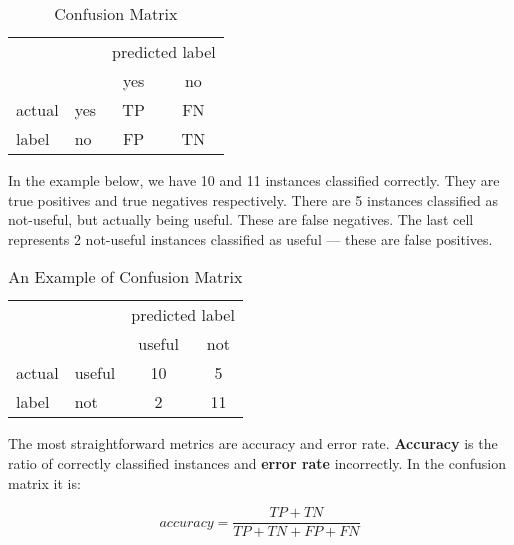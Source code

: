 
\begin{table}[h!]
\center
\begin{tabular}{ll|c|c|}
\cline{3-4}
& & \multicolumn{2}{l|}{predicted label} \\
\cline{3-4}
& & yes & no \\
\hline
\multicolumn{1}{|l|}{actual}& yes & TP & FN\\
\cline{2-4}
\multicolumn{1}{|l|}{label}						   & no & FP & TN \\

\hline

\end{tabular}
	\caption{Confusion Matrix}\label{tab:confmatrix}
\end{table}

In the example below, we have 10 and 11 instances classified correctly. 
They are true positives and true negatives respectively.
There are 5 instances classified as not-useful, but actually being useful.
These are false negatives.
The last cell represents 2 not-useful instances classified as useful --- these are false positives.

\begin{table}[h!]
\center
\begin{tabular}{ll|c|c|}
\cline{3-4}
& & \multicolumn{2}{l|}{predicted label} \\
\cline{3-4}
& & useful & not \\
\hline
\multicolumn{1}{|l|}{actual}& useful & 10 & 5\\
\cline{2-4}
\multicolumn{1}{|l|}{label}						   & not & 2 & 11 \\

\hline

\end{tabular}
	\caption{An Example of Confusion Matrix}\label{tab:confmatrix_ex}
\end{table}


The most straightforward metrics are accuracy and error rate.
{\bf Accuracy} is the ratio of correctly classified instances and {\bf error rate} incorrectly.
In the confusion matrix it is:

\newcommand\TP{\mathit{TP}}  %
\newcommand\TN{\mathit{TN}}
\newcommand\FP{\mathit{FP}}
\newcommand\FN{\mathit{FN}}
\newcommand\ALL{\mathit{All}}
\begin{equation}
\mathit{accuracy} = \frac{\TP + \TN}{\TP + \TN + \FP + \FN}
\end{equation}

